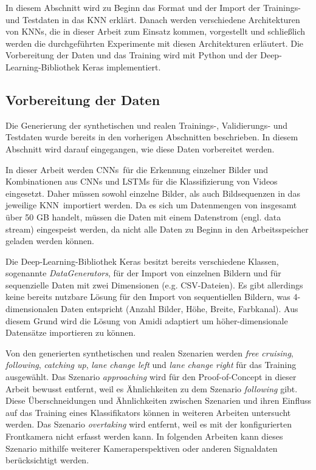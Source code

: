 In diesem Abschnitt wird zu Beginn das Format und der Import der Trainings- und Testdaten in das \ac{KNN} erklärt. Danach werden verschiedene Architekturen von \acp{KNN}, die in dieser Arbeit zum Einsatz kommen, vorgestellt und schließlich werden die durchgeführten Experimente mit diesen Architekturen erläutert. Die Vorbereitung der Daten und das Training wird mit Python und der Deep-Learning-Bibliothek Keras \cite{chollet2015keras} implementiert.


\subsection{Vorbereitung der Daten}
\label{umsetzung_training_input}

Die Generierung der synthetischen und realen Trainings-, Validierungs- und Testdaten wurde bereits in den vorherigen Abschnitten beschrieben. In diesem Abschnitt wird darauf eingegangen, wie diese Daten vorbereitet werden.

In dieser Arbeit werden \acp{CNN} für die Erkennung einzelner Bilder und Kombinationen aus \acp{CNN} und \acp{LSTM} für die Klassifizierung von Videos eingesetzt. Daher müssen sowohl einzelne Bilder, als auch Bildsequenzen in das jeweilige \ac{KNN} importiert werden. Da es sich um Datenmengen von insgesamt über 50 GB handelt, müssen die Daten mit einem Datenstrom (engl. data stream) eingespeist werden, da nicht alle Daten zu Beginn in den Arbeitsspeicher geladen werden können.

Die Deep-Learning-Bibliothek Keras besitzt bereits verschiedene Klassen, sogenannte \textit{DataGenerators}, für der Import von einzelnen Bildern und für sequenzielle Daten mit zwei Dimensionen (e.g. CSV-Dateien). Es gibt allerdings keine bereits nutzbare Lösung für den Import von sequentiellen Bildern, was 4-dimensionalen Daten entspricht (Anzahl Bilder, Höhe, Breite, Farbkanal). Aus diesem Grund wird die Lösung von Amidi \cite{amidi2017datagenerator} adaptiert um höher-dimensionale Datensätze importieren zu können.

Von den generierten synthetischen und realen Szenarien werden \textit{free cruising}, \textit{following}, \textit{catching up}, \textit{lane change left} und \textit{lane change right} für das Training ausgewählt. Das Szenario \textit{approaching} wird für den Proof-of-Concept in dieser Arbeit bewusst entfernt, weil es Ähnlichkeiten zu dem Szenario \textit{following} gibt. Diese Überschneidungen und Ähnlichkeiten zwischen Szenarien und ihren Einfluss auf das Training eines Klassifikators können in weiteren Arbeiten untersucht werden. Das Szenario \textit{overtaking} wird entfernt, weil es mit der konfigurierten Frontkamera nicht erfasst werden kann. In folgenden Arbeiten kann dieses Szenario mithilfe weiterer Kameraperspektiven oder anderen Signaldaten berücksichtigt werden.

